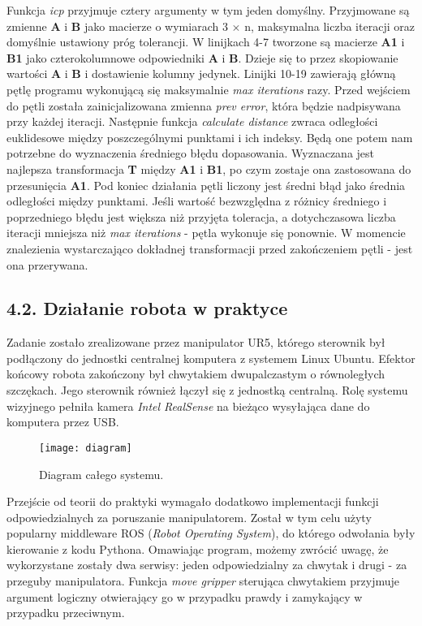 \documentclass{article}
\begin{document}
Funkcja \emph{icp} przyjmuje cztery argumenty w tym jeden domyślny. Przyjmowane są zmienne \textbf{A} i \textbf{B} jako macierze o wymiarach 3 $\times$ n, maksymalna liczba iteracji oraz domyślnie ustawiony próg tolerancji. W linijkach 4-7 tworzone są macierze \textbf{A1} i \textbf{B1} jako czterokolumnowe odpowiedniki \textbf{A} i \textbf{B}. Dzieje się to przez skopiowanie wartości \textbf{A} i \textbf{B} i dostawienie kolumny jedynek. Linijki 10-19 zawierają główną pętlę programu wykonującą się maksymalnie \emph{max iterations} razy. Przed wejściem do pętli została zainicjalizowana zmienna \emph{prev error}, która będzie nadpisywana przy każdej iteracji. Następnie funkcja \emph{calculate distance} zwraca odległości euklidesowe między poszczególnymi punktami i ich indeksy. Będą one potem nam potrzebne do wyznaczenia średniego błędu dopasowania. Wyznaczana jest najlepsza transformacja \textbf{T} między \textbf{A1} i \textbf{B1}, po czym zostaje ona zastosowana do przesunięcia \textbf{A1}. Pod koniec działania pętli liczony jest średni błąd jako średnia odległości między punktami. Jeśli wartość bezwzględna z różnicy średniego i poprzedniego błędu jest większa niż przyjęta toleracja, a dotychczasowa liczba iteracji mniejsza niż \emph{max iterations} - pętla wykonuje się ponownie. W momencie znalezienia wystarczająco dokładnej transformacji przed zakończeniem pętli - jest ona przerywana.

\subsection*{\LARGE{4.2. Działanie robota w praktyce}} 

Zadanie zostało zrealizowane przez manipulator UR5, którego sterownik był podłączony do jednostki centralnej komputera z systemem Linux Ubuntu. Efektor końcowy robota zakończony był chwytakiem dwupalczastym o równoległych szczękach. Jego sterownik również łączył się z jednostką centralną. Rolę systemu wizyjnego pełniła kamera \emph{Intel RealSense} na bieżąco wysyłająca dane do komputera przez USB.

\begin{figure}[h]
\centering
\texttt{[image: diagram]}
\caption{Diagram całego systemu.}
\end{figure}

Przejście od teorii do praktyki wymagało dodatkowo implementacji funkcji odpowiedzialnych za poruszanie manipulatorem. Został w tym celu użyty popularny middleware ROS (\emph{Robot Operating System}), do którego odwołania były kierowanie z kodu Pythona. Omawiając program, możemy zwrócić uwagę, że wykorzystane zostały dwa serwisy: jeden odpowiedzialny za chwytak i drugi - za przeguby manipulatora. Funkcja \emph{move gripper} sterująca chwytakiem przyjmuje argument logiczny otwierający go w przypadku prawdy i zamykający w przypadku przeciwnym.
\end{document}
